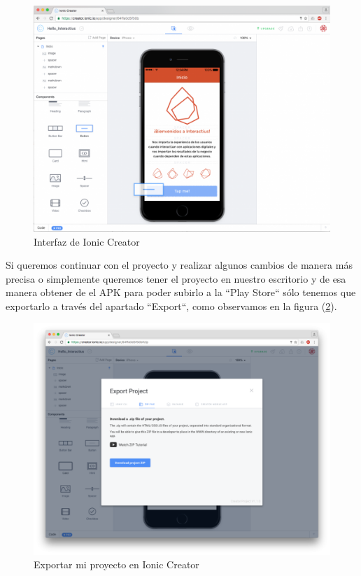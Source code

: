 \documentclass[a4paper, 11pt]{article}
\begin{document}
\begin{itemize}
                \begin{figure}[H]
                  \centering
                       \includegraphics[width=\textwidth]{creator3}
                       \caption{Interfaz de Ionic Creator}
                       \label{f:creator3}
                 \end{figure}

                 Si queremos continuar con el proyecto y realizar algunos cambios
                 de manera más precisa o simplemente queremos tener el proyecto en
                 nuestro escritorio y de esa manera obtener de el APK para poder
                 subirlo a la ``Play Store`` sólo tenemos que exportarlo a través
                 del apartado ``Export``, como observamos en la figura
                 (\ref{f:creator4}).\\

                 \begin{figure}[H]
                   \centering
                        \includegraphics[width=\textwidth]{creator4}
                        \caption{Exportar mi proyecto en Ionic Creator}
                        \label{f:creator4}
                  \end{figure}


\end{itemize}
\end{document}
